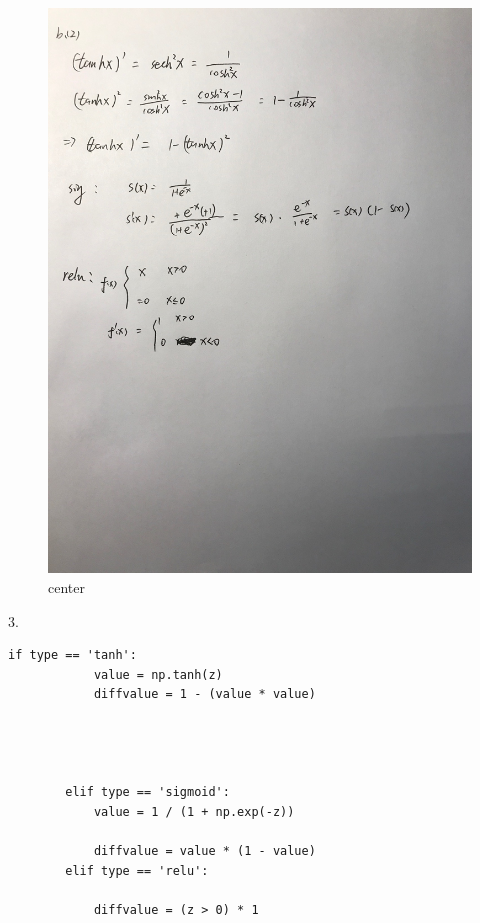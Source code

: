 \documentclass[12pt]{article}
\begin{document}
\begin{figure}[H]
  \caption{center}
  \centering
    \includegraphics[scale=0.2]{b2.jpg}
\end{figure}
3.
\begin{lstlisting}
if type == 'tanh':
            value = np.tanh(z)
            diffvalue = 1 - (value * value)




        elif type == 'sigmoid':
            value = 1 / (1 + np.exp(-z))

            diffvalue = value * (1 - value)
        elif type == 'relu':
            
            diffvalue = (z > 0) * 1
\end{lstlisting}
\end{document}
